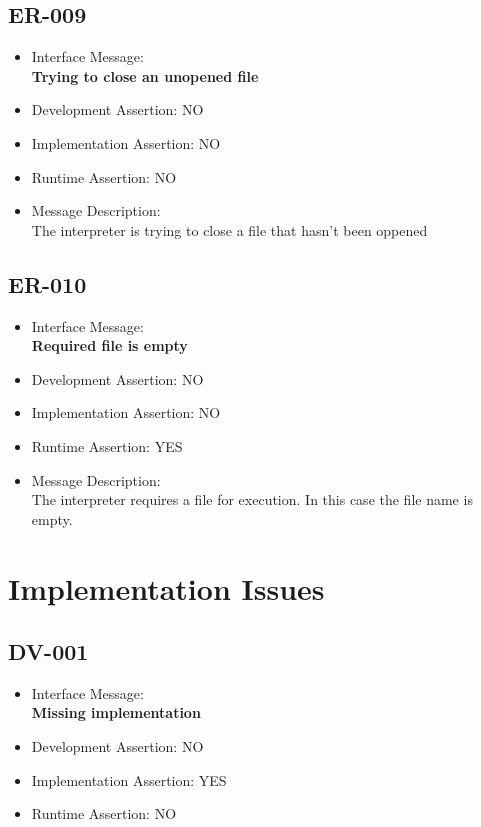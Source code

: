 \subsection{ER-009}
\begin{itemize}
  \item Interface Message:\\[1em]\textbf{Trying to close an unopened file}
  \item Development Assertion: NO
  \item Implementation Assertion: NO
  \item Runtime Assertion: NO
  \item Message Description:\\[1em]The interpreter is trying to close a file that hasn't been oppened
\end{itemize}

\subsection{ER-010}
\begin{itemize}
  \item Interface Message:\\[1em]\textbf{Required file is empty}
  \item Development Assertion: NO
  \item Implementation Assertion: NO
  \item Runtime Assertion: YES
  \item Message Description:\\[1em]The interpreter requires a file for execution. In this case the file name is empty.
\end{itemize}

\section{Implementation Issues}

\subsection{DV-001}
\begin{itemize}
  \item Interface Message:\\[1em]\textbf{Missing implementation}
  \item Development Assertion: NO
  \item Implementation Assertion: YES
  \item Runtime Assertion: NO
\end{itemize}

